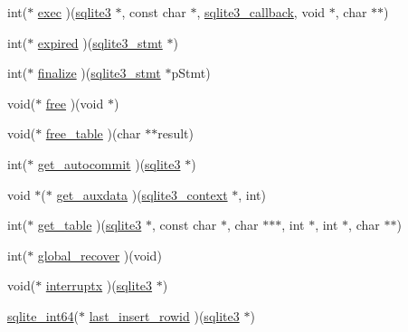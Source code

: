 \begin{DoxyCompactItemize}
\item 
int($\ast$ \hyperlink{structsqlite3__api__routines_ac6476ec4fd66eb629942bd60a47adf76}{exec} )(\hyperlink{sqlite3_8h_a0ef6f2646262c8a9b24368d8ac140f69}{sqlite3} $\ast$, const char $\ast$, \hyperlink{sqlite3_8h_aede337a366367e94a52d849482967ddd}{sqlite3\+\_\+callback}, void $\ast$, char $\ast$$\ast$)
\item 
int($\ast$ \hyperlink{structsqlite3__api__routines_aaf5ef34c7b325eefb8459224a5c926e8}{expired} )(\hyperlink{sqlite3_8h_af2a033da1327cdd77f0a174a09aedd0c}{sqlite3\+\_\+stmt} $\ast$)
\item 
int($\ast$ \hyperlink{structsqlite3__api__routines_a0bbe0b1cdd61a2e7e089ad1e42978f6f}{finalize} )(\hyperlink{sqlite3_8h_af2a033da1327cdd77f0a174a09aedd0c}{sqlite3\+\_\+stmt} $\ast$p\+Stmt)
\item 
void($\ast$ \hyperlink{structsqlite3__api__routines_a7418560cd2dacb9a6cb0b7f5e3082787}{free} )(void $\ast$)
\item 
void($\ast$ \hyperlink{structsqlite3__api__routines_aa94faa431905ee9d04bb93cbce735a0c}{free\+\_\+table} )(char $\ast$$\ast$result)
\item 
int($\ast$ \hyperlink{structsqlite3__api__routines_ae37e25adf7b17f97387fa1ac36094988}{get\+\_\+autocommit} )(\hyperlink{sqlite3_8h_a0ef6f2646262c8a9b24368d8ac140f69}{sqlite3} $\ast$)
\item 
void $\ast$($\ast$ \hyperlink{structsqlite3__api__routines_a1be39621e5074afbd0a81f105105866e}{get\+\_\+auxdata} )(\hyperlink{sqlite3_8h_a3b519553ffec8fc42b2356f5b1ebdc57}{sqlite3\+\_\+context} $\ast$, int)
\item 
int($\ast$ \hyperlink{structsqlite3__api__routines_a3a265a9fa59237ed1630acf4b4f5efc4}{get\+\_\+table} )(\hyperlink{sqlite3_8h_a0ef6f2646262c8a9b24368d8ac140f69}{sqlite3} $\ast$, const char $\ast$, char $\ast$$\ast$$\ast$, int $\ast$, int $\ast$, char $\ast$$\ast$)
\item 
int($\ast$ \hyperlink{structsqlite3__api__routines_a11d469bd09340c52991a7d87fe212395}{global\+\_\+recover} )(void)
\item 
void($\ast$ \hyperlink{structsqlite3__api__routines_adab3cdd36976fa72f7e6662f597818ea}{interruptx} )(\hyperlink{sqlite3_8h_a0ef6f2646262c8a9b24368d8ac140f69}{sqlite3} $\ast$)
\item 
\hyperlink{sqlite3_8h_a520a95f9080c018b2fade39885bd2e2a}{sqlite\+\_\+int64}($\ast$ \hyperlink{structsqlite3__api__routines_a6e69f8e7d32673cf778b58d0856e6dc7}{last\+\_\+insert\+\_\+rowid} )(\hyperlink{sqlite3_8h_a0ef6f2646262c8a9b24368d8ac140f69}{sqlite3} $\ast$)
$$
\end{DoxyCompactItemize}
